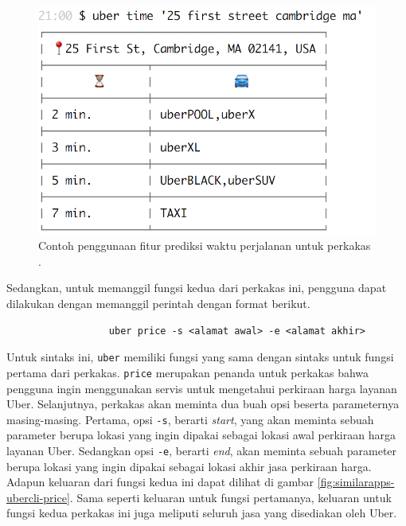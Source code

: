 \documentclass[a4paper,twoside]{article}
\begin{document}
\begin{enumerate}
\begin{figure}[ht]
    \centering
    \includegraphics[width=0.425\linewidth]{ubercli-time}
    \caption[Contoh penggunaan perkakas \ubercli (\textit{time})]{Contoh penggunaan fitur prediksi waktu perjalanan untuk perkakas \ubercli.\protect\footnotemark}
    \label{fig:similarapps-ubercli-time}
\end{figure}

Sedangkan, untuk memanggil fungsi kedua dari perkakas ini, pengguna dapat dilakukan dengan \linebreak memanggil perintah dengan format berikut.

\begin{verbatim}
                  uber price -s <alamat awal> -e <alamat akhir>
\end{verbatim}

Untuk sintaks ini, \verb|uber| memiliki fungsi yang sama dengan sintaks untuk fungsi pertama dari perkakas. \verb|price| merupakan penanda untuk perkakas bahwa pengguna ingin menggunakan servis untuk \linebreak mengetahui perkiraan harga layanan Uber. Selanjutnya, perkakas akan meminta dua buah opsi beserta parameternya masing-masing. Pertama, opsi \verb|-s|, berarti \textit{start}, yang akan meminta sebuah parameter berupa lokasi yang ingin dipakai sebagai lokasi awal perkiraan harga layanan Uber. Sedangkan opsi \verb|-e|, berarti \textit{end}, akan meminta sebuah parameter berupa lokasi yang ingin dipakai sebagai lokasi akhir jasa perkiraan harga.
\newline\newline\noindent
Adapun keluaran dari fungsi kedua ini dapat dilihat di gambar \ref{fig:similarapps-ubercli-price}. Sama seperti keluaran untuk fungsi pertamanya, keluaran untuk fungsi kedua perkakas ini juga meliputi seluruh jasa yang disediakan oleh Uber.


\end{enumerate}
\end{document}
